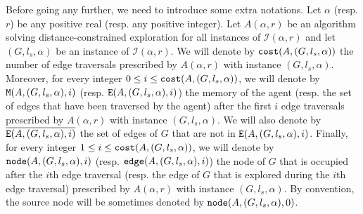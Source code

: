 \documentclass[11pt]{article}
\begin{document}
{Before going any further, we need to introduce some extra notations. Let $\alpha$ (resp. $r$) be any positive real (resp. any positive integer). Let $A(\alpha,r)$ be an algorithm solving distance-constrained exploration for all instances of $\mathcal{I}(\alpha,r)$ and let $(G,l_s,\alpha)$ be an instance of $\mathcal{I}(\alpha,r)$. We will denote by ${\tt cost}(A,(G,l_s,\alpha))$ the number of edge traversals prescribed by $A(\alpha,r)$ with instance $(G,l_s,\alpha)$. Moreover, for every integer $0\leq i \leq {\tt cost}(A,(G,l_s,\alpha))$, we will denote by ${\tt M}(A,(G,l_s,\alpha),i)$ (resp. ${\tt E}(A,(G,l_s,\alpha),i)$) the memory of the agent (resp. the set of edges that have been traversed by the agent) after the first $i$ edge traversals prescribed by $A(\alpha,r)$ with instance $(G,l_s,\alpha)$. We will also denote by $\overline{{\tt E}(A,(G,l_s,\alpha),i)}$ the set of edges of $G$ that are not in ${\tt E}(A,(G,l_s,\alpha),i)$. Finally, for every integer $1\leq i \leq {\tt cost}(A,(G,l_s,\alpha))$, we will denote by ${\tt node}(A,(G,l_s,\alpha),i)$ (resp. ${\tt edge}(A,(G,l_s,\alpha),i)$) the node of $G$ that is occupied after the $i$th edge traversal (resp. the edge of $G$ that is explored during the $i$th edge traversal) prescribed by $A(\alpha,r)$ with instance $(G,l_s,\alpha)$. By convention, the source node will be sometimes denoted by ${\tt node}(A,(G,l_s,\alpha),0)$.

}
\end{document}
